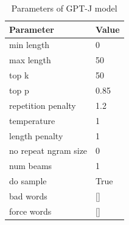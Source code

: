 \begin{table}[h] 
\centering
\begin{tabular}{|l|l|}
\hline
Parameter          & Value \\ \hline
min length         & 0    \\ 
max length         & 50    \\ 
top k              & 50    \\
top p              & 0.85  \\
repetition penalty & 1.2   \\
temperature        & 1     \\
length penalty     & 1     \\
no repeat ngram size     & 0     \\
num beams &  1 \\
do sample & True \\
bad words & [\space] \\
force words & [\space] \\ \hline
\end{tabular}
\caption{Parameters of GPT-J model}\label{table:parametersGPTJTable}
\end{table}

